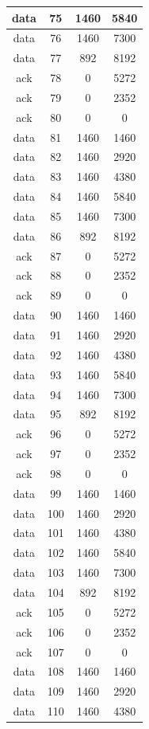 \documentclass[a4paper,11pt,final]{report}
\begin{document}
\begin{longtable}{|c|c|c|c|}
data & 75 & 1460 & 5840 \\ \hline
data & 76 & 1460 & 7300 \\ \hline
data & 77 & 892 & 8192 \\ \hline
ack & 78 & 0 & 5272 \\ \hline
ack & 79 & 0 & 2352 \\ \hline
ack & 80 & 0 & 0 \\ \hline
data & 81 & 1460 & 1460 \\ \hline
data & 82 & 1460 & 2920 \\ \hline
data & 83 & 1460 & 4380 \\ \hline
data & 84 & 1460 & 5840 \\ \hline
data & 85 & 1460 & 7300 \\ \hline
data & 86 & 892 & 8192 \\ \hline
ack & 87 & 0 & 5272 \\ \hline
ack & 88 & 0 & 2352 \\ \hline
ack & 89 & 0 & 0 \\ \hline
data & 90 & 1460 & 1460 \\ \hline
data & 91 & 1460 & 2920 \\ \hline
data & 92 & 1460 & 4380 \\ \hline
data & 93 & 1460 & 5840 \\ \hline
data & 94 & 1460 & 7300 \\ \hline
data & 95 & 892 & 8192 \\ \hline
ack & 96 & 0 & 5272 \\ \hline
ack & 97 & 0 & 2352 \\ \hline
ack & 98 & 0 & 0 \\ \hline
data & 99 & 1460 & 1460 \\ \hline
data & 100 & 1460 & 2920 \\ \hline
data & 101 & 1460 & 4380 \\ \hline
data & 102 & 1460 & 5840 \\ \hline
data & 103 & 1460 & 7300 \\ \hline
data & 104 & 892 & 8192 \\ \hline
ack & 105 & 0 & 5272 \\ \hline
ack & 106 & 0 & 2352 \\ \hline
ack & 107 & 0 & 0 \\ \hline
data & 108 & 1460 & 1460 \\ \hline
data & 109 & 1460 & 2920 \\ \hline
data & 110 & 1460 & 4380 \\ \hline

\end{longtable}
\end{document}
